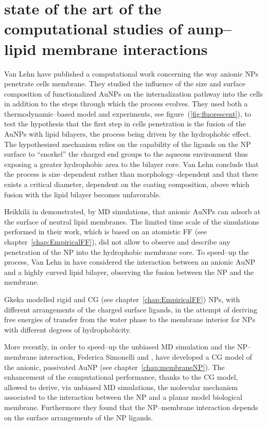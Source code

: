 \section{state of the art of the computational studies of aunp--lipid membrane interactions}
Van Lehn \etal have published a computational work \cite{VanLehn2013} concerning the way anionic \acp{NP} penetrate cells membrane. They studied the influence of the size and surface composition of functionalized \acp{AuNP} on the internalization pathway into the cells in addition to the steps through which the process evolves. They used both a thermodynamic--based model and experiments, see figure~(\ref{fig:fluorescent}), to test the hypothesis that the first step in cells penetration is the fusion of the \acp{AuNP} with lipid bilayers, the process being driven by the hydrophobic effect. The hypothesized mechanism relies on the capability of the ligands on the \ac{NP} surface to ``snorkel'' the charged end groups to the aqueous environment thus exposing a greater hydrophobic area to the bilayer core. Van Lehn \etal conclude that the process is size--dependent rather than morphology--dependent and that there exists a critical diameter, dependent on the coating composition, above which fusion with the lipid bilayer becomes unfavorable.

Heikkilä \etal in \cite{Heikkila2014} demonstrated, by \ac{MD} simulations, that anionic \acp{AuNP} can adsorb at the surface of neutral lipid membranes. The limited time scale of the simulations performed in their work, which is based on an atomistic \ac{FF} (see chapter~\ref{chap:EmpiricalFF}), did not allow to observe and describe any penetration of the \ac{NP} into the hydrophobic membrane core. To speed--up the process, Van Lehn \etal in \cite{VanLehn2014} have considered the interaction between an anionic \ac{AuNP} and a highly curved lipid bilayer, observing the fusion between the \ac{NP} and the membrane.

Gkeka \etal modelled rigid \cite{Gkeka2013} and \ac{CG} \cite{Gkeka2014} (see chapter~\ref{chap:EmpiricalFF}) \acp{NP}, with different arrangements of the charged surface ligands, in the attempt of deriving free energies of transfer from the water phase to the membrane interior for \acp{NP} with different degrees of hydrophobicity.

More recently, in order to speed--up the unbiased \ac{MD} simulation and the \ac{NP}--membrane interaction, Federica Simonelli \etal \cite{simonelliThesis} and \cite{ourPaper}, have developed a \ac{CG} model of the anionic, passivated \ac{AuNP} (see chapter~\ref{chap:membraneNP}). The enhancement of the computational performance, thanks to the \ac{CG} model, allowed to derive, via unbiased \ac{MD} simulations, the molecular mechanism associated to the interaction between the \ac{NP} and a planar model biological membrane. Furthermore they found that the \ac{NP}--membrane interaction depends on the surface arrangements of the \ac{NP} ligands.

